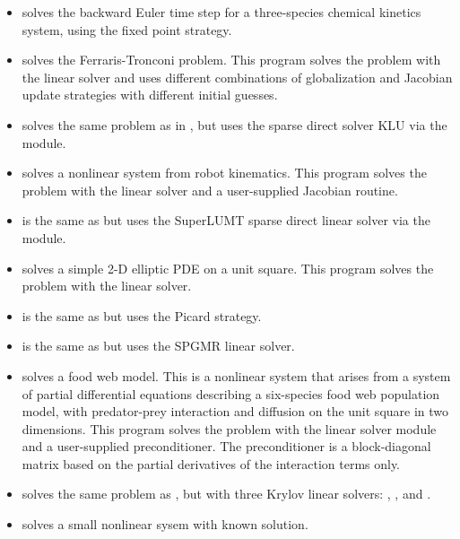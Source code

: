 \begin{itemize}
\item {}
  solves the backward Euler time step for a three-species chemical kinetics
  system, using the fixed point strategy.

\item {}
  solves the Ferraris-Tronconi problem.
  \newline
  This program solves the problem with the {\sunlinsoldense} linear solver
  and uses different combinations of globalization and Jacobian
  update strategies with different initial guesses.
\item {}
  solves the same problem as in , but uses the
  sparse direct solver KLU via the {\sunlinsolklu} module.

\item {}
  solves a nonlinear system from robot kinematics.
  \newline
  This program solves the problem with the {\sunlinsoldense} linear solver
  and a user-supplied Jacobian routine.
\item {}
  is the same as  but uses the SuperLUMT sparse direct
  linear solver via the {\sunlinsolslumt} module.

\item {}
  solves a simple 2-D elliptic PDE on a unit square.
 \newline
  This program solves the problem with the {\sunlinsolband} linear solver.
\item {}
  is the same as  but uses the Picard strategy.
\item {}
  is the same as  but uses the SPGMR linear solver.

\item {}
  solves a food web model.
  \newline
  This is a nonlinear system that arises from a system of partial
  differential equations describing a six-species food web population
  model, with predator-prey interaction and diffusion on the unit
  square in two dimensions.
  This program solves the problem with the {\sunlinsolspgmr} linear
  solver module and a user-supplied preconditioner. The preconditioner is a
  block-diagonal matrix based on the partial derivatives of the
  interaction terms only.
\item {}
  solves the same problem as , but with three Krylov
  linear solvers: {\sunlinsolspgmr}, {\sunlinsolspbcgs}, and {\sunlinsolsptfqmr}.

\item {} solves a small nonlinear sysem with known solution.
  
\end{itemize}

